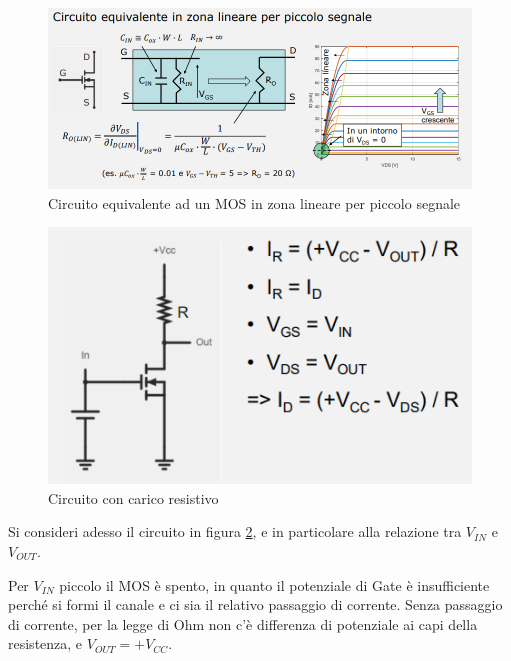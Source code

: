 \documentclass{article}
\begin{document}
\begin{figure}[h]
  \centering
  \includegraphics[scale=0.6]{IM_MOS_equivalente_lineare_bis}
  \caption{Circuito equivalente ad un MOS in zona lineare per piccolo segnale}
  \label{Schema_MOS_equivalente_lineare_bis}
\end{figure}
\clearpage
\begin{figure}[h]
  \centering
  \includegraphics[scale=0.6]{IM_inverter}
  \caption{Circuito con carico resistivo}
  \label{Schema_inverter}
\end{figure}

Si consideri adesso il circuito in figura \ref{Schema_inverter}, e in particolare alla relazione tra $V_{IN}$ e $V_{OUT}$. 

\vspace{1mm}

Per $V_{IN}$ piccolo il MOS è spento, in quanto il potenziale di Gate è insufficiente perché si formi il canale e ci sia il relativo passaggio di corrente. Senza passaggio di corrente, per la legge di Ohm non c'è differenza di potenziale ai capi della resistenza, e $V_{OUT} = + V_{CC}$. 

\vspace{1mm}
\end{document}
